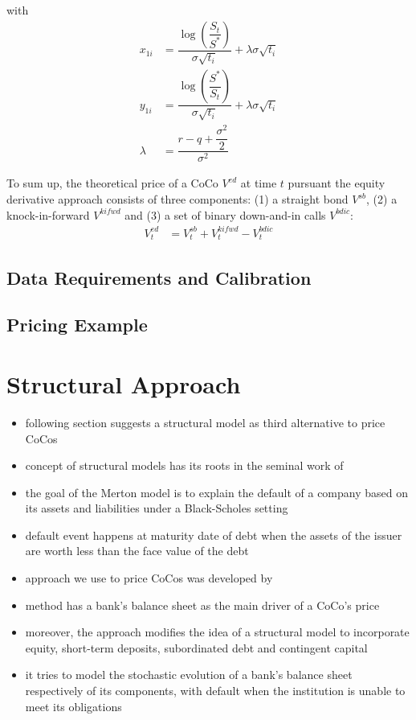with 
\begin{align*}
x_{1i} &= \dfrac{\log \left( \dfrac{S_t}{S^*} \right)}{\sigma \sqrt{t_i}} + \lambda \sigma \sqrt{t_i}\\
y_{1i} &= \dfrac{\log \left( \dfrac{S^*}{S_t} \right)}{\sigma \sqrt{t_i}} + \lambda \sigma \sqrt{t_i}\\
\lambda &= \dfrac{r-q+\dfrac{\sigma^2}{2}}{\sigma^2}
\end{align*}

To sum up, the theoretical price of a CoCo $V^{ed}$ at time $t$ pursuant the equity derivative approach consists of three components: (1) a straight bond $V^{sb}$, (2) a knock-in-forward $V^{kifwd}$ and (3) a set of binary down-and-in calls $V^{bdic}$:
\begin{align}
    V^{ed}_t &= V^{sb}_t + V_t^{kifwd} - V_{t}^{bdic} 
\end{align}

\subsection{Data Requirements and Calibration}

\subsection{Pricing Example}

\section{Structural Approach}
\begin{itemize}
\item following section suggests a structural model as third alternative to price CoCos
\item concept of structural models has its roots in the seminal work of \citet{merton1974pricing}
\item the goal of the Merton model is to explain the default of a company based on its assets and liabilities under a Black-Scholes setting
\item default event happens at maturity date of debt when the assets of the issuer are worth less than the face value of the debt \citep{duffie2003credit}
\end{itemize}
\begin{itemize}
\item approach we use to price CoCos was developed by \citet{pennacchi2010structural}
\item method has a bank's balance sheet as the main driver of a CoCo's price
\item moreover, the approach modifies the idea of a structural model to incorporate equity, short-term deposits, subordinated debt and contingent capital 
\item it tries to model the stochastic evolution of a bank's balance sheet respectively of its components, with default when the institution is unable to meet its obligations \citep{duffie2003credit}
\end{itemize}

